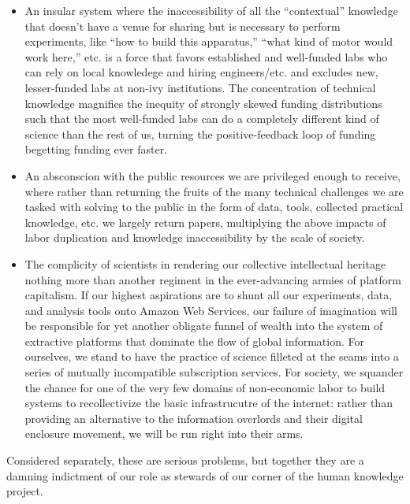 \documentclass[10pt]{tufte-book}
\begin{document}
\begin{itemize}

\item
  An insular system where the inaccessibility of all the ``contextual''
  knowledge \citep{woolKnowledgeNetworksHow2020, barleyBackroomsScienceWork1994}  that doesn't have a venue for
  sharing but is necessary to perform experiments, like ``how to build
  this apparatus,'' ``what kind of motor would work here,'' etc. is a
  force that favors established and well-funded labs who can rely on
  local knowledege and hiring engineers/etc. and excludes new,
  lesser-funded labs at non-ivy institutions. The concentration of
  technical knowledge magnifies the inequity of strongly skewed funding
  distributions such that the most well-funded labs can do a completely
  different kind of science than the rest of us, turning the
  positive-feedback loop of funding begetting funding ever faster.
\item
  An absconscion with the public resources we are privileged enough to
  receive, where rather than returning the fruits of the many technical
  challenges we are tasked with solving to the public in the form of
  data, tools, collected practical knowledge, etc. we largely return
  papers, multiplying the above impacts of labor duplication and
  knowledge inaccessibility by the scale of society.
\item
  The complicity of scientists in rendering our collective intellectual
  heritage nothing more than another regiment in the ever-advancing
  armies of platform capitalism. If our highest aspirations are to shunt
  all our experiments, data, and analysis tools onto Amazon Web
  Services, our failure of imagination will be responsible for yet
  another obligate funnel of wealth into the system of extractive
  platforms that dominate the flow of global information. For ourselves,
  we stand to have the practice of science filleted at the seams into a
  series of mutually incompatible subscription services. For society, we
  squander the chance for one of the very few domains of non-economic
  labor to build systems to recollectivize the basic infrastrucutre of
  the internet: rather than providing an alternative to the information
  overlords and their digital enclosure movement, we will be run right
  into their arms.
\end{itemize}

Considered separately, these are serious problems, but together they are
a damning indictment of our role as stewards of our corner of the human
knowledge project.
\end{document}
